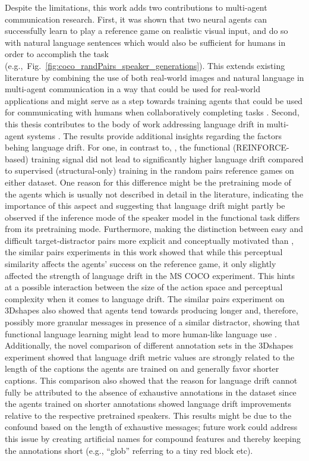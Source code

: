 Despite the limitations, this work adds two contributions to multi-agent communication research. First, it was shown that two neural agents can successfully learn to play a reference game on realistic visual input, and do so with natural language sentences which would also be sufficient for humans in order to accomplish the task (e.g.,~Fig.~\ref{fig:coco_randPairs_speaker_generations}).
This extends existing literature by combining the use of both real-world images and natural language in multi-agent communication in a way that could be used for real-world applications and might serve as a step towards training agents that could be used for communicating with humans when collaboratively completing tasks \parencite{lazaridou2020emergent, havrylov2017emergence, lazaridou2016multi, andreas2016reasoning, cohn2018pragmatically}. 
Second, this thesis contributes to the body of work addressing language drift in multi-agent systems \parencite[e.g.,][]{lewis2017deal, lee2019countering, lazaridou2020multi}. The results provide additional insights regarding the factors behing language drift. For one, in contrast to, \cite[e.g.,][]{lewis2017deal, lee2019countering}, the functional (REINFORCE-based) training signal did not lead to significantly higher language drift compared to supervised (structural-only) training in the random pairs reference games on either dataset. One reason for this difference might be the pretraining mode of the agents which is usually not described in detail in the literature, indicating the importance of this aspect and suggesting that language drift might partly be observed if the inference mode of the speaker model in the functional task differs from its pretraining mode. Furthermore, making the distinction between easy and difficult target-distractor pairs more explicit and conceptually motivated than \cite{lazaridou2020multi}, the similar pairs experiments in this work showed that while this perceptual similarity affects the agents' success on the reference game, it only slightly affected the strength of language drift in the MS COCO experiment. This hints at a possible interaction between the size of the action space and perceptual complexity when it comes to language drift. The similar pairs experiment on 3Dshapes also showed that agents tend towards producing longer and, therefore, possibly more granular messages in presence of a similar distractor, showing that functional language learning might lead to more human-like language use \parencite[cf.][]{graf2016animal}.
Additionally, the novel comparison of different annotation sets in the 3Dshapes experiment showed that language drift metric values are strongly related to the length of the captions the agents are trained on and generally favor shorter captions. This comparison also showed that the reason for language drift cannot fully be attributed to the absence of exhaustive annotations in the dataset since the agents trained on shorter annotations showed language drift improvements relative to the respective pretrained speakers. This results might be due to the confound based on the length of exhaustive messages; future work could address this issue by creating artificial names for compound features and thereby keeping the annotations short (e.g., ``glob'' referring to a tiny red block etc).
